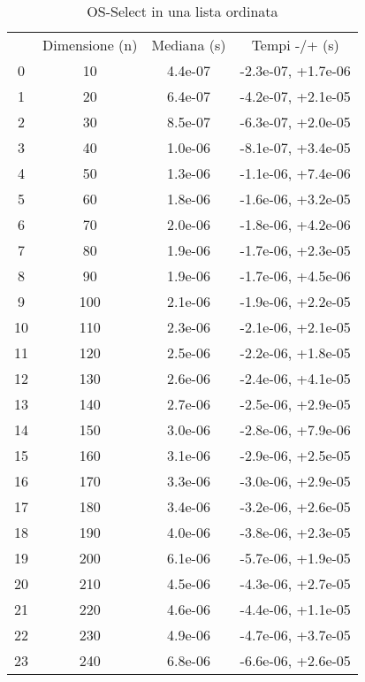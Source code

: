 \begin{table}
\centering
\caption{OS-Select in una lista ordinata}
\label{OS-Select in una lista ordinata}
\begin{adjustbox}{width=1\textwidth/2}
\begin{tabular}{|c|c|c|c|}
\hline
 & Dimensione (n) & Mediana (s) & Tempi -/+ (s) \\
0 & 10 & 4.4e-07 & -2.3e-07, +1.7e-06 \\
\cline{1-4}
1 & 20 & 6.4e-07 & -4.2e-07, +2.1e-05 \\
\cline{1-4}
2 & 30 & 8.5e-07 & -6.3e-07, +2.0e-05 \\
\cline{1-4}
3 & 40 & 1.0e-06 & -8.1e-07, +3.4e-05 \\
\cline{1-4}
4 & 50 & 1.3e-06 & -1.1e-06, +7.4e-06 \\
\cline{1-4}
5 & 60 & 1.8e-06 & -1.6e-06, +3.2e-05 \\
\cline{1-4}
6 & 70 & 2.0e-06 & -1.8e-06, +4.2e-06 \\
\cline{1-4}
7 & 80 & 1.9e-06 & -1.7e-06, +2.3e-05 \\
\cline{1-4}
8 & 90 & 1.9e-06 & -1.7e-06, +4.5e-06 \\
\cline{1-4}
9 & 100 & 2.1e-06 & -1.9e-06, +2.2e-05 \\
\cline{1-4}
10 & 110 & 2.3e-06 & -2.1e-06, +2.1e-05 \\
\cline{1-4}
11 & 120 & 2.5e-06 & -2.2e-06, +1.8e-05 \\
\cline{1-4}
12 & 130 & 2.6e-06 & -2.4e-06, +4.1e-05 \\
\cline{1-4}
13 & 140 & 2.7e-06 & -2.5e-06, +2.9e-05 \\
\cline{1-4}
14 & 150 & 3.0e-06 & -2.8e-06, +7.9e-06 \\
\cline{1-4}
15 & 160 & 3.1e-06 & -2.9e-06, +2.5e-05 \\
\cline{1-4}
16 & 170 & 3.3e-06 & -3.0e-06, +2.9e-05 \\
\cline{1-4}
17 & 180 & 3.4e-06 & -3.2e-06, +2.6e-05 \\
\cline{1-4}
18 & 190 & 4.0e-06 & -3.8e-06, +2.3e-05 \\
\cline{1-4}
19 & 200 & 6.1e-06 & -5.7e-06, +1.9e-05 \\
\cline{1-4}
20 & 210 & 4.5e-06 & -4.3e-06, +2.7e-05 \\
\cline{1-4}
21 & 220 & 4.6e-06 & -4.4e-06, +1.1e-05 \\
\cline{1-4}
22 & 230 & 4.9e-06 & -4.7e-06, +3.7e-05 \\
\cline{1-4}
23 & 240 & 6.8e-06 & -6.6e-06, +2.6e-05 \\

\end{tabular}
\end{adjustbox}
\end{table}
